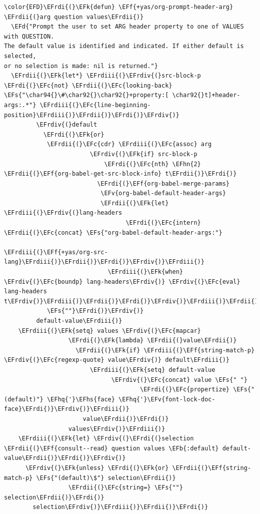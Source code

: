 \documentclass{scrartcl}
\newcommand{\EFk}[1]{\textcolor{EFk}{#1}} %
\newcommand{\EFd}[1]{\textcolor{EFd}{#1}} %
\newcommand{\EFs}[1]{\textcolor{EFs}{#1}} %
\newcommand{\EFb}[1]{\textcolor{EFb}{#1}} %
\newcommand{\EFc}[1]{\textcolor{EFc}{#1}} %
\newcommand{\EFv}[1]{\textcolor{EFv}{#1}} %
\newcommand{\EFf}[1]{\textcolor{EFf}{#1}} %
\newcommand{\EFhn}[1]{#1} %
\newcommand{\EFhq}[1]{#1} %
\newcommand{\EFhs}[1]{#1} %
\newcommand{\EFrdi}[1]{#1} %
\newcommand{\EFrdii}[1]{#1} %
\newcommand{\EFrdiii}[1]{#1} %
\newcommand{\EFrdiv}[1]{#1} %
\begin{document}
\begin{Code}
\begin{Verbatim}[]
\color{EFD}\EFrdi{(}\EFk{defun} \EFf{+yas/org-prompt-header-arg} \EFrdii{(}arg question values\EFrdii{)}
  \EFd{"Prompt the user to set ARG header property to one of VALUES with QUESTION.
The default value is identified and indicated. If either default is selected,
or no selection is made: nil is returned."}
  \EFrdii{(}\EFk{let*} \EFrdiii{(}\EFrdiv{(}src-block-p \EFrdi{(}\EFc{not} \EFrdii{(}\EFc{looking-back} \EFs{"\char94{}\#\char92{}\char92{}+property:[ \char92{}t]+header-args:.*"} \EFrdiii{(}\EFc{line-beginning-position}\EFrdiii{)}\EFrdii{)}\EFrdi{)}\EFrdiv{)}
         \EFrdiv{(}default
           \EFrdi{(}\EFk{or}
            \EFrdii{(}\EFc{cdr} \EFrdiii{(}\EFc{assoc} arg
                        \EFrdiv{(}\EFk{if} src-block-p
                            \EFrdi{(}\EFc{nth} \EFhn{2} \EFrdii{(}\EFf{org-babel-get-src-block-info} t\EFrdii{)}\EFrdi{)}
                          \EFrdi{(}\EFf{org-babel-merge-params}
                           \EFv{org-babel-default-header-args}
                           \EFrdii{(}\EFk{let} \EFrdiii{(}\EFrdiv{(}lang-headers
                                  \EFrdi{(}\EFc{intern} \EFrdii{(}\EFc{concat} \EFs{"org-babel-default-header-args:"}
                                                  \EFrdiii{(}\EFf{+yas/org-src-lang}\EFrdiii{)}\EFrdii{)}\EFrdi{)}\EFrdiv{)}\EFrdiii{)}
                             \EFrdiii{(}\EFk{when} \EFrdiv{(}\EFc{boundp} lang-headers\EFrdiv{)} \EFrdiv{(}\EFc{eval} lang-headers t\EFrdiv{)}\EFrdiii{)}\EFrdii{)}\EFrdi{)}\EFrdiv{)}\EFrdiii{)}\EFrdii{)}
            \EFs{""}\EFrdi{)}\EFrdiv{)}
         default-value\EFrdiii{)}
    \EFrdiii{(}\EFk{setq} values \EFrdiv{(}\EFc{mapcar}
                  \EFrdi{(}\EFk{lambda} \EFrdii{(}value\EFrdii{)}
                    \EFrdii{(}\EFk{if} \EFrdiii{(}\EFf{string-match-p} \EFrdiv{(}\EFc{regexp-quote} value\EFrdiv{)} default\EFrdiii{)}
                        \EFrdiii{(}\EFk{setq} default-value
                              \EFrdiv{(}\EFc{concat} value \EFs{" "}
                                      \EFrdi{(}\EFc{propertize} \EFs{"(default)"} \EFhq{'}\EFhs{face} \EFhq{'}\EFv{font-lock-doc-face}\EFrdi{)}\EFrdiv{)}\EFrdiii{)}
                      value\EFrdii{)}\EFrdi{)}
                  values\EFrdiv{)}\EFrdiii{)}
    \EFrdiii{(}\EFk{let} \EFrdiv{(}\EFrdi{(}selection \EFrdii{(}\EFf{consult--read} question values \EFb{:default} default-value\EFrdii{)}\EFrdi{)}\EFrdiv{)}
      \EFrdiv{(}\EFk{unless} \EFrdi{(}\EFk{or} \EFrdii{(}\EFf{string-match-p} \EFs{"(default)\$"} selection\EFrdii{)}
                  \EFrdii{(}\EFc{string=} \EFs{""} selection\EFrdii{)}\EFrdi{)}
        selection\EFrdiv{)}\EFrdiii{)}\EFrdii{)}\EFrdi{)}
\end{Verbatim}
\end{Code}
\end{document}
